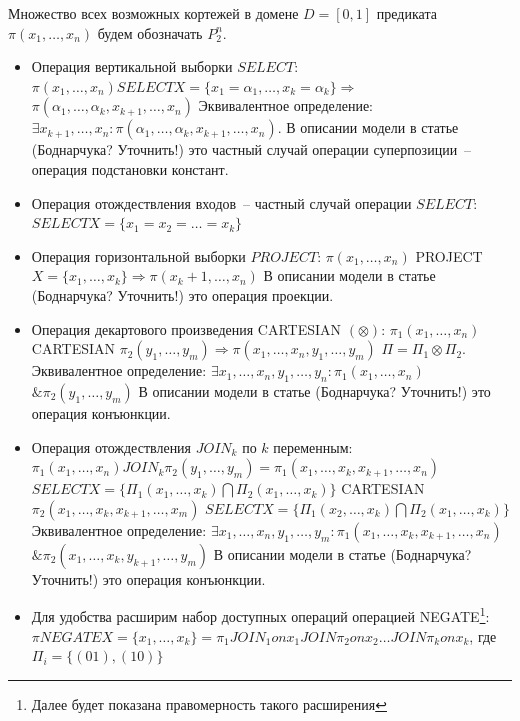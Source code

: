 \documentclass[12pt]{article}
\begin{document}
Множество всех возможных кортежей в домене $D=[0,1]$ предиката $\pi(x_1, \dots, x_n)$ будем обозначать $P_2^n$. 
\begin{itemize}
\item Операция вертикальной выборки $SELECT$:
$\pi(x_1, \dots, x_n) SELECT X=\{x_1=\alpha_1, \ldots, x_k=\alpha_k\} \Longrightarrow$
$\pi(\alpha_1, \dots, \alpha_k, x_{k+1}, \dots, x_n)$
Эквивалентное определение: $\exists x_{k+1}, \dots, x_n: \pi(\alpha_1, \dots, \alpha_k, x_{k+1}, \dots, x_n)$. 
В описании модели в статье (Боднарчука? Уточнить!) это частный случай операции суперпозиции~-- операция подстановки констант.
\item Операция отождествления входов~-- частный случай операции $SELECT$: $SELECT X=\{x_1=x_2=\dots=x_k\}$
\item Операция горизонтальной выборки $PROJECT$:
$\pi(x_1, \dots, x_n)$ PROJECT $X=\{x_1, \dots, x_k\} \Longrightarrow \pi(x_k+1, \dots, x_n)$
В описании модели в статье (Боднарчука? Уточнить!) это операция проекции.
\item Операция декартового произведения CARTESIAN $(\otimes)$:
$\pi_1(x_1, \dots, x_n)$ CARTESIAN $\pi_2(y_1, \dots, y_m) \Longrightarrow \pi(x_1, \dots, x_n, y_1, \dots, y_m)$
$\Pi = \Pi_1 \otimes\Pi_2$.
Эквивалентное определение: $\exists x_1, \dots, x_n, y_1, \dots, y_n: \pi_1(x_{1}, \dots, x_n)$
$\& \pi_2(y_1, \dots, y_m)$
В описании модели в статье (Боднарчука? Уточнить!) это операция конъюнкции.
\item Операция отождествления $JOIN_k$ по $k$ переменным:
$\pi_1(x_1, \dots, x_n) JOIN_k \pi_2(y_1, \dots, y_m) = \pi_1(x_1, \dots, x_k, x_{k+1}, \dots, x_n)$
$SELECT X=\{\Pi_1(x_1, \dots, x_k) \bigcap \Pi_2(x_1, \dots, x_k)\}$ CARTESIAN $\pi_2(x_1, \dots, x_k, x_{k+1}, \dots, x_m)$
$SELECT X=\{\Pi_1(x_2, \dots, x_k) \bigcap  \Pi_2(x_1, \dots, x_k)\}$ 
Эквивалентное определение: $\exists x_1, \dots, x_n, y_1, \dots, y_m: \pi_1(x_{1}, \dots, x_k, x_{k+1}, \dots, x_n)$
$\& \pi_2(x_1, \dots, x_k, y_{k+1}, \dots, y_m)$
В описании модели в статье (Боднарчука? Уточнить!) это операция конъюнкции.
\item Для удобства расширим набор доступных операций операцией NEGATE\footnote{Далее будет показана правомерность такого расширения}: 
$\pi NEGATE X=\{x_1, \dots, x_k\} = \pi_1 JOIN_1 on x_1 JOIN \pi_2 on x_2 \dots JOIN \pi_k on x_k$, где 
$\Pi_i = \{ (01), (10) \}$
\end{itemize}
\end{document}
